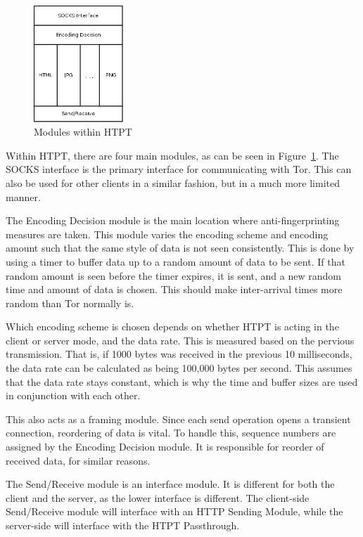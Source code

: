 \begin{figure}[b]
\centering
\includegraphics[width=0.3\textwidth]{htpt_architecture}
\caption{Modules within HTPT}
\label{fig:htpt_modules}
\end{figure}

Within HTPT, there are four main modules, as can be seen in Figure~\ref{fig:htpt_modules}. The SOCKS interface is the primary interface for communicating with Tor. This can also be used for other clients in a similar fashion, but in a much more limited manner.

The Encoding Decision module is the main location where anti-fingerprinting measures are taken. This module varies the encoding scheme and encoding amount such that the same style of data is not seen consistently. This is done by using a timer to buffer data up to a random amount of data to be sent. If that random amount is seen before the timer expires, it is sent, and a new random time and amount of data is chosen. This should make inter-arrival times more random than Tor normally is. 

Which encoding scheme is chosen depends on whether HTPT is acting in the client or server mode, and the data rate. This is measured based on the pervious transmission. That is, if 1000 bytes was received in the previous 10 milliseconds, the data rate can be calculated as being 100,000 bytes per second. This assumes that the data rate stays constant, which is why the time and buffer sizes are used in conjunction with each other.

This also acts as a framing module. Since each send operation opens a transient connection, reordering of data is vital. To handle this, sequence numbers are assigned by the Encoding Decision module. It is responsible for reorder of received data, for similar reasons. 

The Send/Receive module is an interface module. It is different for both the client and the server, as the lower interface is different. The client-side Send/Receive module will interface with an HTTP Sending Module, while the server-side will interface with the HTPT Passthrough.

